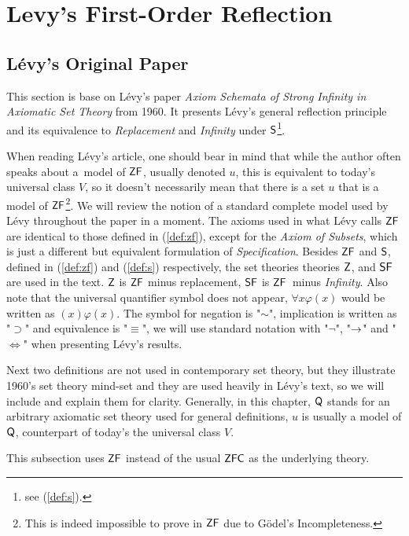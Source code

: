 \section{Levy's First-Order Reflection}\label{sec:first_order}

\subsection{Lévy's Original Paper}\label{sec:levy1960}
This section is base on Lévy's paper \emph{Axiom Schemata of Strong Infinity in Axiomatic Set Theory} \cite{Levy60a} from 1960. It presents Lévy's general reflection principle and its equivalence to \emph{Replacement} and \emph{Infinity} under $\sf{S}$\footnote{see (\ref{def:s}).}.

When reading Lévy's article, one should bear in mind that while the author often speaks about a~model of $\sf{ZF}$, usually denoted $u$, this is equivalent to today's universal class $V$, so it doesn't necessarily mean that there is a set $u$ that is a model of $\sf{ZF}$\footnote{This is indeed impossible to prove in $\sf{ZF}$ due to Gödel's Incompleteness.}. We will review the notion of a standard complete model used by Lévy throughout the paper in a moment.
The axioms used in what Lévy calls $\sf{ZF}$ are identical to those defined in (\ref{def:zf}), except for the \emph{Axiom of Subsets},
which is just a different but equivalent formulation of \emph{Specification}. %
Besides $\sf{ZF}$ and $\sf{S}$, defined in (\ref{def:zf}) and (\ref{def:s}) respectively, the set theories theories $\sf{Z}$, and $\sf{SF}$ are used in the text. $\sf{Z}$ is $\sf{ZF}$ minus replacement, $\sf{SF}$ is $\sf{ZF}$ minus \emph{Infinity}. Also note that the universal quantifier symbol does not appear, $\forall x \varphi (x)$ would be written as $(x) \varphi (x)$. The symbol for negation is "$\sim$", implication is written as "$\supset$" and equivalence is "$\equiv$", we will use standard notation with "$\neg$", "$\rightarrow$" and "$\iff$" when presenting Lévy's results.

Next two definitions are not used in contemporary set theory, but they illustrate 1960's set theory mind-set and they are used heavily in Lévy's text, so we will include and explain them for clarity. Generally, in this chapter, $\sf{Q}$ stands for an arbitrary axiomatic set theory used for general definitions, $u$ is usually a model of $\sf{Q}$, counterpart of today's the universal class $V$.

This subsection uses $\sf{ZF}$ instead of the usual $\sf{ZFC}$ as the underlying theory.

